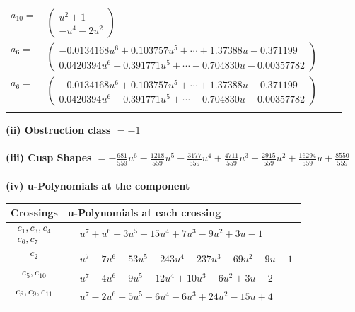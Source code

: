 \documentclass[1p]{elsarticle_modified}
\theoremstyle{definition}
\begin{document}
\begin{tabular}{m{7pt} m{180pt} m{7pt} m{180pt} }
\flushright $a_{10}=$&$\begin{pmatrix}u^2+1\\- u^4-2 u^2\end{pmatrix}$ \\
\flushright $a_{6}=$&$\begin{pmatrix}-0.0134168 u^{6}+0.103757 u^{5}+\cdots+1.37388 u-0.371199\\0.0420394 u^{6}-0.391771 u^{5}+\cdots-0.704830 u-0.00357782\end{pmatrix}$\\ \flushright $a_{6}=$&$\begin{pmatrix}-0.0134168 u^{6}+0.103757 u^{5}+\cdots+1.37388 u-0.371199\\0.0420394 u^{6}-0.391771 u^{5}+\cdots-0.704830 u-0.00357782\end{pmatrix}$\\&\end{tabular}
\flushleft \textbf{(ii) Obstruction class $= -1$}\\~\\
\flushleft \textbf{(iii) Cusp Shapes $= -\frac{681}{559} u^6-\frac{1218}{559} u^5-\frac{3177}{559} u^4+\frac{4711}{559} u^3+\frac{2915}{559} u^2+\frac{16294}{559} u+\frac{8550}{559}$}\\~\\
\newpage\renewcommand{\arraystretch}{1}
\flushleft \textbf{(iv) u-Polynomials at the component}\newline \\
\begin{tabular}{m{50pt}|m{274pt}}
Crossings & \hspace{64pt}u-Polynomials at each crossing \\
\hline $$\begin{aligned}c_{1},c_{3},c_{4}\\c_{6},c_{7}\end{aligned}$$&$\begin{aligned}
&u^7+u^6-3 u^5-15 u^4+7 u^3-9 u^2+3 u-1
\end{aligned}$\\
\hline $$\begin{aligned}c_{2}\end{aligned}$$&$\begin{aligned}
&u^7-7 u^6+53 u^5-243 u^4-237 u^3-69 u^2-9 u-1
\end{aligned}$\\
\hline $$\begin{aligned}c_{5},c_{10}\end{aligned}$$&$\begin{aligned}
&u^7-4 u^6+9 u^5-12 u^4+10 u^3-6 u^2+3 u-2
\end{aligned}$\\
\hline $$\begin{aligned}c_{8},c_{9},c_{11}\end{aligned}$$&$\begin{aligned}
&u^7-2 u^6+5 u^5+6 u^4-6 u^3+24 u^2-15 u+4
\end{aligned}$\\
\hline
\end{tabular}\\~\\
\end{document}
